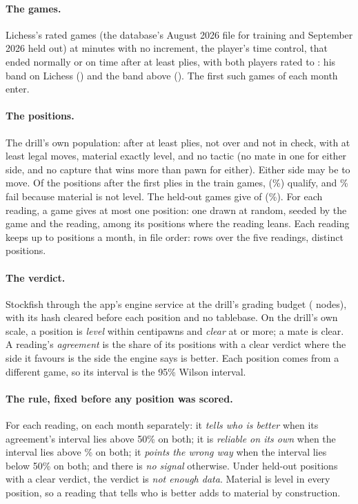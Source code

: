 \documentclass[11pt]{article}
\begin{document}
\paragraph{The games.} Lichess's rated games (the database's August 2026 file for training and
September 2026 held out) at \Minutes{} minutes with no increment, the player's time control, that
ended normally or on time after at least \MinPlies{} plies, with both players rated
\RatingLow{} to \RatingHigh: his band on Lichess (\BandLow) and the band above (\BandHigh). The
first \GamesPerMonth{} such games of each month enter.

\paragraph{The positions.} The drill's own population: after at least \PlyFloor{} plies, not over
and not in check, with at least \MinLegal{} legal moves, material exactly level, and no tactic
(no mate in one for either side, and no capture that wins more than \TacticBar{} pawn for either).
Either side may be to move. Of the \TrainLater{} positions after the first \PlyFloor{} plies in
the train games, \TrainQualifying{} (\TrainQualifyingPct\%) qualify, and \TrainLevelDrop\% fail because
material is not level. The held-out games give \HeldQualifying{} of \HeldLater{}
(\HeldQualifyingPct\%). For each reading, a game gives at most one position: one drawn at random,
seeded by the game and the reading, among its positions where the reading leans. Each reading
keeps up to \Cap{} positions a month, in file order: \Rows{} rows over the five readings,
\Unique{} distinct positions.

\paragraph{The verdict.} Stockfish through the app's engine service at the drill's grading budget
(\BudgetNodes{} nodes), with its hash cleared before each position and no tablebase. On the
drill's own scale, a position is \emph{level} within \LevelCp{} centipawns and \emph{clear} at
\ClearCp{} or more; a mate is clear. A reading's \emph{agreement} is the share of its positions
with a clear verdict where the side it favours is the side the engine says is better. Each
position comes from a different game, so its interval is the 95\% Wilson interval.

\paragraph{The rule, fixed before any position was scored.} For each reading, on each month
separately: it \emph{tells who is better} when its agreement's interval lies above 50\% on both;
it is \emph{reliable on its own} when the interval lies above \ReliablePct\% on both; it
\emph{points the wrong way} when the interval lies below 50\% on both; and there is \emph{no
signal} otherwise. Under \MinHeldout{} held-out positions with a clear verdict, the verdict is
\emph{not enough data}. Material is level in every position, so a reading that tells who is
better adds to material by construction.
\end{document}
